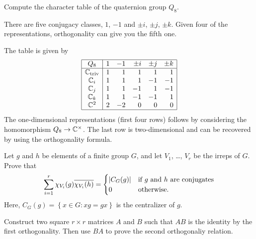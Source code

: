 \begin{problem}
	[Quaternions]
	Compute the character table of the quaternion group $Q_8$.
	\begin{hint}
		There are five conjugacy classes, $1$, $-1$
		and $\pm i$, $\pm j$, $\pm k$.
		Given four of the representations, orthogonality
		can give you the fifth one.
	\end{hint}
	\begin{sol}
		The table is given by
		\[
			\begin{array}{|c|rrrrr|}
				\hline
				Q_8 & 1 & -1 & \pm i & \pm j & \pm k \\ \hline
				\mathbb C_{\mathrm{triv}} & 1 & 1 & 1 & 1 & 1 \\
				\mathbb C_i & 1 & 1 & 1 & -1 & -1 \\
				\mathbb C_j & 1 & 1 & -1 & 1 & -1 \\
				\mathbb C_k & 1 & 1 & -1 & -1 & 1 \\
				\mathbb C^2 & 2 & -2 & 0 & 0 & 0 \\\hline
			\end{array}
		\]
		The one-dimensional representations (first four rows)
		follows by considering the homomorphism $Q_8 \to \mathbb C^\times$.
		The last row is two-dimensional and can be recovered
		by using the orthogonality formula.
	\end{sol}
\end{problem}

\begin{sproblem}
	\label{prob:second_orthog}
	\gim
	Let $g$ and $h$ be elements of a finite group $G$,
	and let $V_1$, \dots, $V_r$ be the irreps of $G$.
	Prove that
	\[
		\sum_{i = 1}^r \chi_{V_i}(g) \overline{\chi_{V_i}(h)}
		=
		\begin{cases}
			|C_G(g)| & \text{if $g$ and $h$ are conjugates} \\
			0 & \text{otherwise}.
		\end{cases}
	\]
	Here, $C_G(g) = \left\{ x \in G : xg = gx \right\}$
	is the centralizer of $g$.
	\begin{hint}
		Construct two square $r \times r$ matrices $A$ and $B$
		such that $AB$ is the identity by the first orthogonality.
		Then use $BA$ to prove the second orthogonaliy relation.
	\end{hint}
\end{sproblem}
